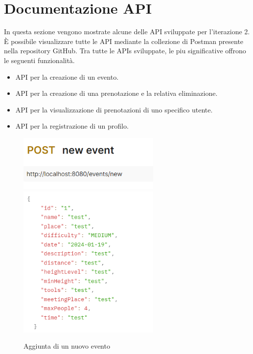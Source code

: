 \section{Documentazione API}
In questa sezione vengono mostrate alcune delle API sviluppate per l’iterazione 2. 
È possibile visualizzare tutte le API mediante la collezione di Postman presente nella repository GitHub.
Tra tutte le APIs sviluppate, le piu significative offrono le seguenti funzionalità.
\begin{itemize}
    \item API per la creazione di un evento.
    \item API per la creazione di una prenotazione e la relativa eliminazione.
    \item API per la visualizzazione di prenotazioni di uno specifico utente.
    \item API per la registrazione di un profilo.
\end{itemize}


\newpage

\begin{figure}[h!]
\includegraphics[width=7cm]{Iterazione 2/test/postman/tnewevent.PNG}\\
\includegraphics[width=7cm]{Iterazione 2/test/postman/newevent.PNG}\\
\caption{Aggiunta di un nuovo evento}
\end{figure}

